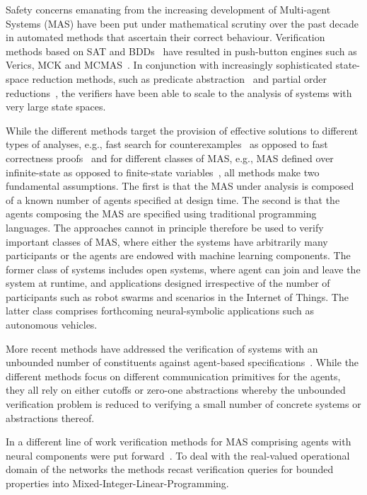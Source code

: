 Safety concerns emanating from the increasing development of Multi-agent Systems
(MAS) have been put under mathematical scrutiny over the past decade  in
automated methods that ascertain their correct behaviour. Verification methods
based on SAT and BDDs~\cite{KacprzakLomuscioPenczek04b,RaimondiLomuscio05c} have
resulted in push-button engines such as Verics, MCK and
MCMAS~\cite{GammieMeyden04a,Kacprzak+07a,LomuscioQuRaimondi15}.  In conjunction
with increasingly sophisticated state-space reduction methods, such as predicate
abstraction~\cite{lomuscio2015verifying} and partial order
reductions~\cite{jamroga2020towards}, the verifiers have been able to scale to
the analysis of systems with very large state spaces.


While the different methods target the provision of effective solutions to
different types of analyses, e.g., fast search for
counterexamples~\cite{penczek2003verifying} as opposed to fast correctness
proofs~\cite{ball2006abstraction} and for different classes of MAS, e.g., MAS
defined over infinite-state as opposed to finite-state
variables~\cite{lomuscio2015verifying}, all methods make two fundamental
assumptions. The first is that the MAS under analysis is composed of a known
number of agents specified at design time. The second is that the agents
composing the MAS are specified using traditional programming languages.  The
approaches cannot in principle therefore be used to verify important classes of
MAS, where either the systems have arbitrarily many participants or the agents 
are endowed with machine learning components. The former class of systems
includes open systems, where agent can join and leave the system at runtime, and
applications designed irrespective of the number of participants such as robot
swarms and scenarios in the Internet of Things. The latter class comprises
forthcoming neural-symbolic applications such as autonomous vehicles.

More recent methods have addressed the verification of systems with an unbounded
number of constituents against agent-based
specifications~\cite{KouvarosLomuscio16a,KouvarosLomuscio15b,KouvarosLomuscio16c}.
While the different methods focus on different communication primitives for the
agents, they all rely on either cutoffs or zero-one abstractions whereby
the unbounded verification problem is reduced to verifying a small
number of concrete systems or abstractions thereof.  

In a different line of work verification methods for MAS comprising agents with 
neural components were put forward~\cite{Akintunde+20b,Akintunde+22}. To deal
with the real-valued operational domain of the networks the methods recast
verification queries for bounded properties into
Mixed-Integer-Linear-Programming.

